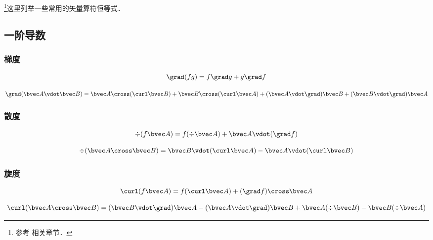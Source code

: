 
\begin{issues}
\issueAbstract
\end{issues}



\footnote{参考 \cite{GriffE} 相关章节．}这里列举一些常用的矢量算符恒等式．

\subsection{一阶导数}
\subsubsection{梯度}
\begin{equation}\label{VopEq_eq2}
\grad (fg) = f\grad g + g \grad f
\end{equation}

\begin{equation}
\grad (\bvec A \vdot \bvec B) = \bvec A \cross (\curl \bvec B) + \bvec B \cross (\curl \bvec A) + (\bvec A \vdot \grad) \bvec B + (\bvec B \vdot \grad) \bvec A
\end{equation}

\subsubsection{散度}

\begin{equation}\label{VopEq_eq1}
\div (f \bvec A) = f (\div \bvec A) + \bvec A \vdot (\grad f)
\end{equation}

\begin{equation}\label{VopEq_eq4}
\div (\bvec A \cross \bvec B) = \bvec B \vdot (\curl \bvec A) - \bvec A \vdot (\curl \bvec B)
\end{equation}

\subsubsection{旋度}
\begin{equation}\label{VopEq_eq3}
\curl(f\bvec A) = f (\curl\bvec A) + (\grad f) \cross\bvec A
\end{equation}

\begin{equation}\label{VopEq_eq6}
\curl (\bvec A \cross \bvec B) = (\bvec B \vdot \grad) \bvec A - (\bvec A \vdot \grad) \bvec B + \bvec A (\div \bvec B) - \bvec B (\div \bvec A)
\end{equation}


